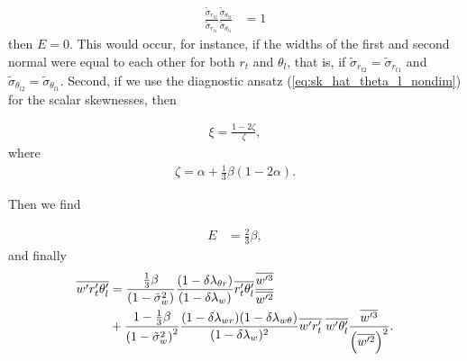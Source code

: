 \begin{align*}
    \frac{\tilde{\sigma}_{r_{t2}}}{\tilde{\sigma}_{r_{t1}}} \frac{\tilde{\sigma}_{\theta_{l2}}}{\tilde{\sigma}_{\theta_{l1}}}
    &= 1
\end{align*}
then $E=0$.
This would occur, for instance, if the widths of the first and second normal were equal to each other for both $r_t$ and $\theta_l$, that is, if $\tilde{\sigma}_{r_{t2}} = \tilde{\sigma}_{r_{t1}}$ and $\tilde{\sigma}_{\theta_{l2}} = \tilde{\sigma}_{\theta_{l1}}$.
Second, if we use the diagnostic ansatz (\cref{eq:sk_hat_theta_l_nondim}) for the scalar skewnesses, then

\begin{align}
    \label{eq:xi}
    \xi = \frac{1 - 2 \zeta}{\zeta},
\end{align}
where
\begin{align}
    \label{eq:zeta}
    \zeta = \alpha + \frac{1}{3} \beta \left(1 - 2 \alpha \right).
\end{align}

Then we find

\begin{align}
    \label{eq:E_eq_23beta}
    E &= \frac{2}{3} \beta,
\end{align}
and finally
\begin{align}
    \label{eq:wpqtpthlp_beta}
    \overline{w' r_t' \theta_l'}
    &= \frac{\frac{1}{3}\beta}{\left( 1 - \tilde{\sigma}_w^2 \right)} \frac{(1-\delta \lambda_{\theta r})}{(1 - \delta \lambda_w)} \overline{r_t' \theta_l'} \frac{\overline{w'^3}}{\overline{w'^2}} \nonumber\\
    &+ \frac{1 - \frac{1}{3}\beta}{\left( 1 - \tilde{\sigma}_w^2 \right)^2} \frac{(1-\delta \lambda_{w r})(1-\delta \lambda_{w \theta})} {(1 - \delta \lambda_w)^2} \overline{w' r_t'} \; \overline{w' \theta_l'} \frac{\overline{w'^3}}{\left( \overline{w'^2} \right)^2}.
\end{align}